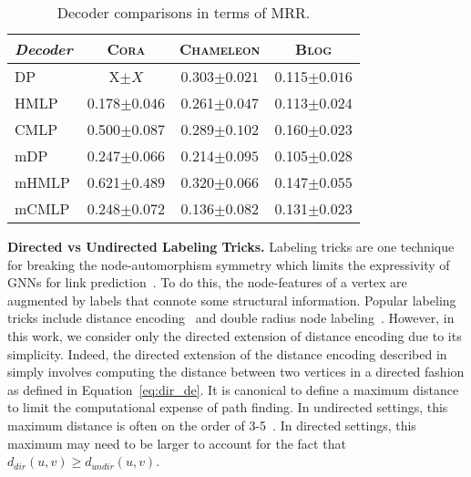 \documentclass{article}
\begin{document}
\begin{table}[h]
\caption{Decoder comparisons in terms of MRR.} 
\centering
\begin{tabular}{l c c c}
\textit{Decoder}  & \textsc{Cora}  & \textsc{Chameleon} & \textsc{Blog}  \\
\hline
DP      & X${\scriptstyle\pm X}$ & 0.303${\scriptstyle\pm0.021}$ &  0.115${\scriptstyle\pm0.016}$ \\
HMLP    & 0.178${\scriptstyle\pm0.046}$ & 0.261${\scriptstyle\pm0.047}$ &  0.113${\scriptstyle\pm0.024}$ \\
\hline
CMLP    & 0.500${\scriptstyle\pm0.087}$ & 0.289${\scriptstyle\pm0.102}$ &  \textcolor{junscolor1}{0.160${\scriptstyle\pm0.023}$} \\
mDP     & 0.247${\scriptstyle\pm0.066}$ & 0.214${\scriptstyle\pm0.095}$ &  0.105${\scriptstyle\pm0.028}$ \\
mHMLP   & \textcolor{junscolor1}{0.621${\scriptstyle\pm0.489}$} & \textcolor{junscolor1}{0.320${\scriptstyle\pm0.066}$} &  0.147${\scriptstyle\pm0.055}$ \\
mCMLP   & 0.248${\scriptstyle\pm0.072}$ & 0.136${\scriptstyle\pm0.082}$ &  0.131${\scriptstyle\pm0.023}$
\end{tabular}
\label{t:ablation_decoder}
\end{table}

\textbf{Directed vs Undirected Labeling Tricks.} Labeling tricks are one technique for breaking the node-automorphism symmetry which limits the expressivity of GNNs for link prediction~\cite{zhang2021labeling}. To do this, the node-features of a vertex are augmented by labels that connote some structural information. Popular labeling tricks include distance encoding~\citep{li2020distance} and double radius node labeling~\citep{zhang2018link}. However, in this work, we consider only the directed extension of distance encoding due to its simplicity. Indeed, the directed extension of the distance encoding described in~\citep{li2020distance} simply involves computing the distance between two vertices in a directed fashion as defined in Equation~\ref{eq:dir_de}. It is canonical to define a maximum distance to limit the computational expense of path finding. In undirected settings, this maximum distance is often on the order of 3-5~\citep{chamberlain2023graph}. In directed settings, this maximum may need to be larger to account for the fact that $d_{dir}(u, v) \ge d_{undir}(u, v) $. 
\end{document}
